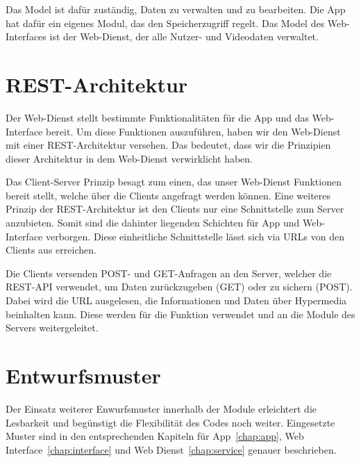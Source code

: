 Das Model ist dafür zuständig, Daten zu verwalten und zu bearbeiten. Die App hat dafür ein eigenes Modul, das den Speicherzugriff regelt. Das Model des Web-Interfaces ist der Web-Dienst, der alle Nutzer- und Videodaten verwaltet.\newline\par

\section{REST-Architektur} \label{allg:Rest}

Der Web-Dienst stellt bestimmte Funktionalitäten für die App und das Web-Interface bereit. Um diese Funktionen auszuführen, haben wir den Web-Dienst mit einer REST-Architektur versehen. Das bedeutet, dass wir die Prinzipien dieser Architektur in dem Web-Dienst verwirklicht haben.\newline

Das Client-Server Prinzip besagt zum einen, das unser Web-Dienst Funktionen bereit stellt, welche über die Clients angefragt werden können. Eine weiteres Prinzip der REST-Architektur ist den Clients nur eine Schnittstelle zum Server anzubieten. Somit sind die dahinter liegenden Schichten für App und Web-Interface verborgen. Diese einheitliche Schnittstelle lässt sich via URLs von den Clients aus erreichen.\newline

Die Clients versenden POST- und GET-Anfragen an den Server, welcher die REST-API verwendet, um Daten zurückzugeben (GET) oder zu sichern (POST). Dabei wird die URL ausgelesen, die Informationen und Daten über Hypermedia beinhalten kann. Diese werden für die Funktion verwendet und an die Module des Servers weitergeleitet.\newline

\section{Entwurfsmuster} \label{allg:Entwurfsmuster}
Der Einsatz weiterer Enwurfsmuster innerhalb der Module erleichtert die Lesbarkeit und begünstigt die Flexibilität des Codes noch weiter. Eingesetzte Muster sind in den entsprechenden Kapiteln für App~\eqref{chap:app}, Web Interface~\eqref{chap:interface} und Web Dienst~\eqref{chap:service} genauer beschrieben.